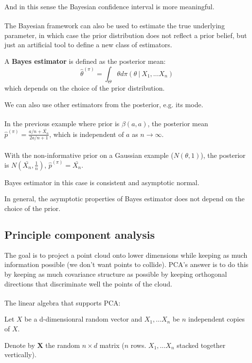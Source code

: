 \documentclass{article}
\begin{document}
And in this sense the Bayesian confidence interval is more meaningful.
\\
\\

The Bayesian framework can also be used to estimate the true underlying parameter,
in which case the prior distribution does not reflect a prior belief,
but just an artificial tool to define a new class of estimators.

A \textbf{Bayes estimator} is defined as the posterior mean:
$$
\hat{\theta}^{(\pi)} = \int_{\Theta} \theta d\pi(\theta ~ | ~ X_1, \dots X_n)
$$
which depends on the choice of the prior distribution.

We can also use other estimators from the posterior, e.g. its mode.
\\
\\
In the previous example where prior is $\beta(a, a)$,
the posterior mean $\hat{p}^{(\pi)} = \frac{a / n + \bar{X_n}}{2 a / n + 1}$,
which is independent of $a$ as $n \rightarrow \infty$.
\\
\\
With the non-informative prior on a Gaussian example ($\mathit{N}(\theta, 1)$),
the posterior is $\mathit{N}(\bar{X_n}, \frac{1}{n})$,
$\hat{p}^{(\pi)} = \bar{X_n}$.

Bayes estimator in this case is consistent and asymptotic normal.

In general,
the asymptotic properties of Bayes estimator does not depend on the choice of the prior.


\subsection{Principle component analysis}

The goal is to project a point cloud onto lower dimensions while keeping as much information possible
(we don't want points to collide).
PCA's answer is to do this by keeping as much covariance structure as possible by keeping orthogonal directions that discriminate well the points of the cloud.
\\
\\

The linear algebra that supports PCA:

Let $X$ be a d-dimensionral random vector and $X_1, \dots X_n$ be $n$ independent copies of $X$.

Denote by $\mathbf{X}$ the random $n \times d$ matrix ($n$ rows. $X_1, \dots X_n$ stacked together vertically).
\end{document}

